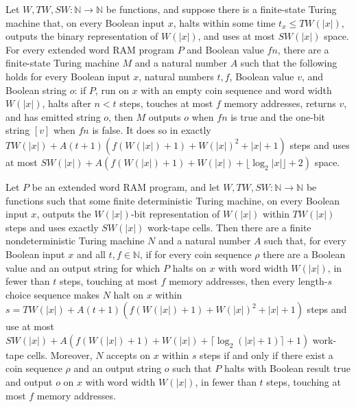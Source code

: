 \begin{theorem}
\label{WordRAM.exists_simulation}
\leanok
{}
Let $W,TW,SW:\mathbb{N}\to\mathbb{N}$ be functions, and suppose there is a finite-state
Turing machine that, on every Boolean input $x$, halts within some time $t_x\le
TW(|x|)$, outputs the binary representation of $W(|x|)$, and uses at most $SW(|x|)$
space. For every extended word RAM program $P$ and Boolean value $fn$, there are a
finite-state Turing machine $M$ and a natural number $A$ such that the following holds
for every Boolean input $x$, natural numbers $t,f$, Boolean value $v$, and Boolean
string $o$: if $P$, run on $x$ with an empty coin sequence and word width $W(|x|)$,
halts after $n<t$ steps, touches at most $f$ memory addresses, returns $v$, and has
emitted string $o$, then $M$ outputs $o$ when $fn$ is true and the one-bit string $[v]$
when $fn$ is false. It does so in exactly $TW(|x|)+A(t+1)(f(W(|x|)+1)+W(|x|)^2+|x|+1)$
steps and uses at most $SW(|x|)+A(f(W(|x|)+1)+W(|x|)+\lfloor\log_2 |x|\rfloor+2)$ space.
\end{theorem}

\begin{theorem}
\label{WordRAM.exists_ndSimulation}
\leanok
{}
Let $P$ be an extended word RAM program, and let $W,TW,SW:\mathbb{N}\to\mathbb{N}$ be
functions such that some finite deterministic Turing machine, on every Boolean input
$x$, outputs the $W(|x|)$-bit representation of $W(|x|)$ within $TW(|x|)$ steps and uses
exactly $SW(|x|)$ work-tape cells. Then there are a finite nondeterministic Turing
machine $N$ and a natural number $A$ such that, for every Boolean input $x$ and all
$t,f\in\mathbb{N}$, if for every coin sequence $\rho$ there are a Boolean value and an
output string for which $P$ halts on $x$ with word width $W(|x|)$, in fewer than $t$
steps, touching at most $f$ memory addresses, then every length-$s$ choice sequence
makes $N$ halt on $x$ within $s=TW(|x|)+A(t+1)(f(W(|x|)+1)+W(|x|)^2+|x|+1)$ steps and
use at most $SW(|x|)+A(f(W(|x|)+1)+W(|x|)+\lceil\log_2(|x|+1)\rceil+1)$ work-tape cells.
Moreover, $N$ accepts on $x$ within $s$ steps if and only if there exist a coin sequence
$\rho$ and an output string $o$ such that $P$ halts with Boolean result true and output
$o$ on $x$ with word width $W(|x|)$, in fewer than $t$ steps, touching at most $f$
memory addresses.
\end{theorem}
